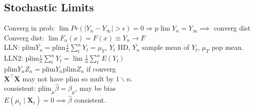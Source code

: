 \subsection*{Stochastic Limits}
Converg in prob: $\lim Pr(\lvert Y_n - Y_{\infty} \rvert > \epsilon) = 0 \Rightarrow \text{p}\lim Y_n = Y_{\infty} \implies$ converg dist\\
Converg dist: $\lim F_n (x) = F(x) \equiv Y_n \rightarrow F$\\
LLN: $\text{plim} \bar{Y_n} = \text{plim} \frac{1}{n} \sum^{n}_{t} Y_t = \mu_{Y}$, $Y_t$ IID, $\bar{Y_n}$ sample mean of $Y_t$, $\mu_T$ pop mean.
LLN2: $\text{plim} \frac{1}{n} \sum_{t}^{n} Y_t = \lim \frac{1}{n} \sum_{t}^{n} E(Y_t)$\\
$\text{plim} Y_n Z_n = \text{plim} Y_n \text{plim} Z_n$ if converg\\
$\mathbf{X^{\top}X}$ may not have plim so mult by $1 \backslash n$.\\
consistent: $\text{plim}_{\mu} \hat{\beta} = \beta_\mu$, may be bias\\
$E(\mu_t \mid \mathbf{X}_t) = 0 \implies \hat{\beta}$ consistent.
